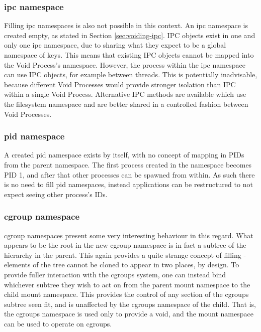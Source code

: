 \documentclass[sigplan]{acmart}
\begin{document}
\subsubsection{ipc namespace}
\label{sec:filling-ipc}

Filling ipc namespaces is also not possible in this context. An ipc namespace is created empty, as stated in Section \ref{sec:voiding-ipc}. IPC objects exist in one and only one ipc namespace, due to sharing what they expect to be a global namespace of keys. This means that existing IPC objects cannot be mapped into the Void Process's namespace. However, the process within the ipc namespace can use IPC objects, for example between threads. This is potentially inadvisable, because different Void Processes would provide stronger isolation than IPC within a single Void Process. Alternative IPC methods are available which use the filesystem namespace and are better shared in a controlled fashion between Void Processes.

\subsubsection{pid namespace}
\label{sec:filling-pid}

A created pid namespace exists by itself, with no concept of mapping in PIDs from the parent namespace. The first process created in the namespace becomes PID 1, and after that other processes can be spawned from within. As such there is no need to fill pid namespaces, instead applications can be restructured to not expect seeing other process's IDs.

\subsubsection{cgroup namespace}
\label{sec:filling-cgroup}

cgroup namespaces present some very interesting behaviour in this regard. What appears to be the root in the new cgroup namespace is in fact a subtree of the hierarchy in the parent. This again provides a quite strange concept of filling - elements of the tree cannot be cloned to appear in two places, by design. To provide fuller interaction with the cgroups system, one can instead bind whichever subtree they wish to act on from the parent mount namespace to the child mount namespace. This provides the control of any section of the cgroups subtree seen fit, and is unaffected by the cgroups namespace of the child. That is, the cgroups namespace is used only to provide a void, and the mount namespace can be used to operate on cgroups.
\end{document}
